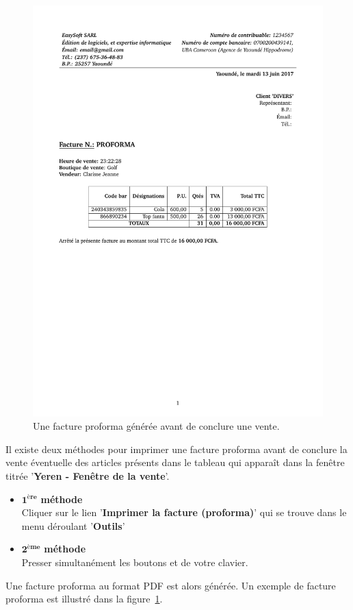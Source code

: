 \begin{figure}[!htbp]
	\centering
	\includegraphics[scale=0.75]{images/yeren-facture-proforma-grand-2017-06-13.pdf}
	\caption{Une facture proforma g\'en\'er\'ee avant de conclure une vente.}
	\label{fig:yeren-vendre-facture-proforma}
\end{figure}

Il existe deux m\'ethodes pour imprimer une facture
proforma avant de conclure la vente \'eventuelle des articles
pr\'esents dans le tableau qui appara\^it dans la fen\^etre
titr\'ee '\textbf{Yeren - Fen\^etre de la vente}'.

\begin{itemize}[]
	\item \textcolor{purplish}{$\mathbf{1^{\text{\`ere}}}$ \textbf{m\'ethode}}\\
		Cliquer sur le lien '\textbf{Imprimer la facture (proforma)}'
		qui se trouve dans le menu d\'eroulant '\textbf{Outils}'\\

	\item \textcolor{purplish}{$\mathbf{2^{\text{\`eme}}}$ \textbf{m\'ethode}}\\
		Presser simultan\'ement les boutons 
		et  de votre clavier.
\end{itemize}

Une facture proforma au format PDF est alors g\'en\'er\'ee. Un
exemple de facture proforma est illustr\'e dans la
figure~\ref{fig:yeren-vendre-facture-proforma}.
